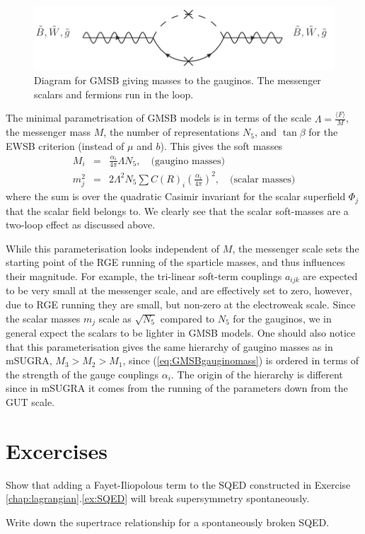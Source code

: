 \documentclass[notes.tex]{subfiles}
\begin{document}
\begin{figure}[h!]
\begin{center}
\includegraphics[scale=0.8]{figures/GMSB} 
\caption{Diagram for GMSB giving masses to the gauginos. The messenger scalars and fermions run in the loop.}
\label{fig:GMSB}
\end{center}
\end{figure}

The minimal parametrisation of GMSB models is in terms of the scale $\Lambda = \frac{\langle F\rangle}{M}$, the messenger mass $M$, the number of representations $N_5$, and $\tan\beta$ for the EWSB criterion (instead of $\mu$ and $b$). This gives the soft masses
\begin{eqnarray}
M_i &=& \frac{\alpha_i}{4\pi}\Lambda N_5,\quad\text{(gaugino masses)}\label{eq:GMSBgauginomass}\\
m_j^2 &=& 2\Lambda^2 N_5 \sum C(R)_i\left(\frac{\alpha_i}{4\pi}\right)^2,\quad\text{(scalar masses)}
\end{eqnarray}
where the sum is over the quadratic Casimir invariant for the scalar superfield $\Phi_j$ that the scalar field belongs to. We clearly see that the scalar soft-masses are a two-loop effect as discussed above. 

While this parameterisation looks independent of $M$, the messenger scale sets the starting point of the RGE running of the sparticle masses, and thus influences their magnitude. For example, the tri-linear soft-term couplings $a_{ijk}$ are expected to be very small at the messenger scale, and are effectively set to zero, however, due to RGE running they are small, but non-zero at the electroweak scale. Since the scalar masses $m_j$ scale as $\sqrt{N_5}$ compared to $N_5$ for the gauginos, we in general expect the scalars to be lighter in GMSB models. One should also notice that this parameterisation  gives the same hierarchy of gaugino masses as in mSUGRA, $M_3>M_2>M_1$, since (\ref{eq:GMSBgauginomass}) is ordered in terms of the strength of the gauge couplings $\alpha_i$. The origin of the hierarchy is different since in mSUGRA it comes from the running of the parameters down from the GUT scale.





\section{Excercises}

\begin{Exercise}[]
Show that adding a Fayet-Iliopolous term to the SQED constructed in Exercise \ref{chap:lagrangian}.\ref{ex:SQED} will break supersymmetry spontaneously.
\end{Exercise}

\begin{Exercise}[]
Write down the supertrace relationship for a spontaneously broken SQED.
\end{Exercise}
\end{document}
